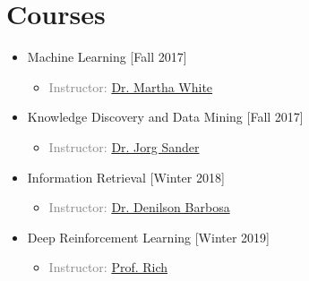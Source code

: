 \documentclass[10pt,a4paper,sans]{moderncv} %
\begin{document}
	
	
	
	\section{Courses}
	\begin{multicols}{2}
		\begin{itemize}
			\item {} Machine Learning \hfill[Fall 2017]
			\begin{itemize}
				\item \textcolor{gray}{Instructor: \href{http://webdocs.cs.ualberta.ca/~whitem/}{Dr. Martha White}}
			\end{itemize}
			
			\item {} Knowledge Discovery and Data Mining \hfill[Fall 2017]
			\begin{itemize}
				\item \textcolor{gray}{Instructor: \href{http://webdocs.cs.ualberta.ca/~joerg/}{Dr. Jorg Sander}}
			\end{itemize}
			
			
			\item {} Information Retrieval \hfill[Winter 2018]
			\begin{itemize}
				\item \textcolor{gray}{Instructor: \href{https://sites.ualberta.ca/~denilson/}{Dr. Denilson Barbosa}}
			\end{itemize}
			
			\item {} Deep Reinforcement Learning \hfill[Winter 2019]
			\begin{itemize}
				\item \textcolor{gray}{Instructor: \href{http://incompleteideas.net/}{Prof. Rich}}
			\end{itemize}
			
		\end{itemize}
	\end{multicols}
	
\end{document}
